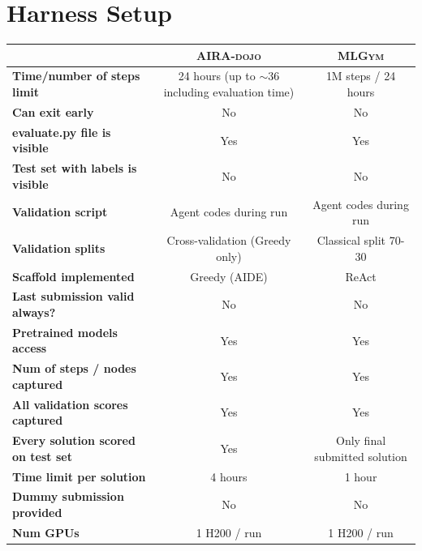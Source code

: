\documentclass{fairmeta}
\newcommand{\airadojo}{\textsc{AIRA-dojo}}
\newcommand{\mlgym}{\textsc{MLGym}}
\begin{document}
\newpage
\section{Harness Setup}
\label{sec:harness}

\begin{table}[ht]
\centering
\small
\renewcommand{\arraystretch}{1.2}
\begin{tabular}{lcc}
\toprule
& \textbf{\airadojo} & \textbf{\mlgym} \\
\hline
\textbf{Time/number of steps limit} &
24 hours (up to $\sim$36 including evaluation time) &
1M steps / 24 hours \\
\hline
\textbf{Can exit early} &
No &
No \\
\hline

\textbf{evaluate.py file is visible} &
Yes &
Yes \\
\hline

\textbf{Test set with labels is visible} &
No &
No \\
\hline

\textbf{Validation script} &
Agent codes during run &
Agent codes during run \\
\hline

\textbf{Validation splits} &
Cross-validation (Greedy only) &
Classical split 70-30 \\
\hline

\textbf{Scaffold implemented} &
Greedy (AIDE) &
ReAct \\
\hline

\textbf{Last submission valid always?} &
No &
No \\
\hline

\textbf{Pretrained models access} &
Yes &
Yes \\
\hline

\textbf{Num of steps / nodes captured} &
Yes &
Yes \\
\hline

\textbf{All validation scores captured} &
Yes &
Yes \\
\hline

\textbf{Every solution scored on test set} &
Yes &
Only final submitted solution \\
\hline

\textbf{Time limit per solution} &
4 hours &
1 hour \\
\hline

\textbf{Dummy submission provided} &
No &
No \\
\hline

\textbf{Num GPUs} &
1 H200 / run &
1 H200 / run \\
\hline


\end{tabular}
\end{table}
\end{document}

